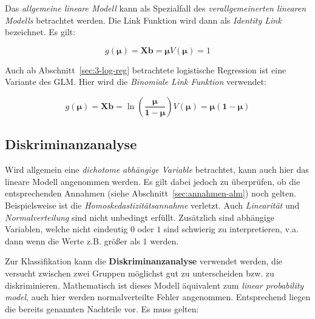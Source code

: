 \documentclass{article}
\numberwithin{equation}{section}
\begin{document}
Das \emph{allgemeine lineare Modell} kann als Spezialfall des \emph{verallgemeinerten linearen Modells} betrachtet werden. Die Link Funktion wird dann als \emph{Identity Link} bezeichnet. Es gilt:

\begin{subequations}
\begin{equation}
g(\mathbf{\mu}) = \mathbf{Xb} = \mathbf{\mu}
\end{equation}
\begin{equation}
V(\mathbf{\mu}) = 1
\end{equation}
\end{subequations}

Auch ab Abschnitt~\ref{sec:3-log-reg} betrachtete logistische Regression ist eine Variante des GLM. Hier wird die \emph{Binomiale Link Funktion} verwendet:

\begin{subequations}
\begin{equation}
g(\mathbf{\mu}) = \mathbf{Xb} = \ln \left( \frac{\mathbf{\mu}}{\mathbf{1-\mu}} \right)
\end{equation}
\begin{equation}
V(\mathbf{\mu}) = \mathbf{\mu} (\mathbf{1-\mu})
\end{equation}
\end{subequations}

\subsection{Diskriminanzanalyse}

Wird allgemein eine \emph{dichotome abhängige Variable} betrachtet, kann auch hier das lineare Modell angenommen werden. Es gilt dabei jedoch zu überprüfen, ob die entsprechenden Annahmen (siehe Abschnitt~\ref{sec:annahmen-alm}) noch gelten. Beispielsweise ist die \emph{Homoskedastizitätsannahme} verletzt. Auch \emph{Linearität} und \emph{Normalverteilung} sind nicht unbedingt erfüllt. Zusätzlich sind abhängige Variablen, welche nicht eindeutig $0$ oder $1$ sind schwierig zu interpretieren, v.a. dann wenn die Werte z.B. größer als $1$ werden.

Zur Klassifikation kann die \textbf{Diskriminanzanalyse} verwendet werden, die versucht zwischen zwei Gruppen möglichst gut zu unterscheiden bzw. zu diskriminieren. Mathematisch ist dieses Modell äquivalent zum \emph{linear probability model}, auch hier werden normalverteilte Fehler angenommen. Entsprechend liegen die bereits genannten Nachteile vor. Es muss gelten:
\end{document}
